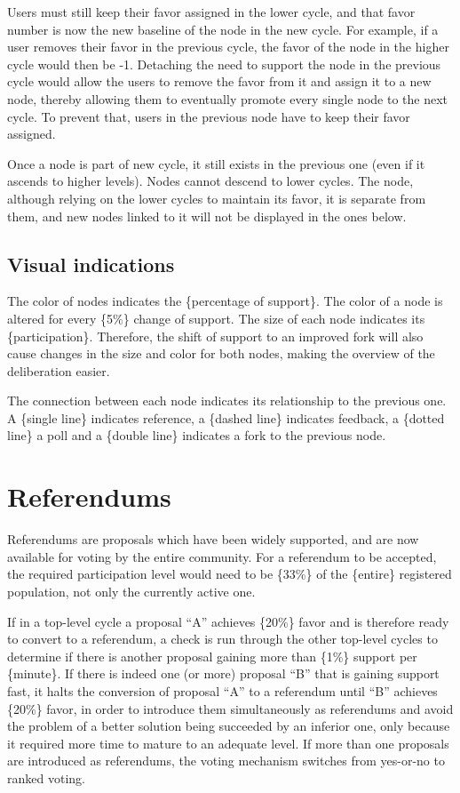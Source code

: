 \documentclass[a4paper,11pt]{article}
\begin{document}
\begin{multicols}{2}
Users must still keep their favor assigned in the lower cycle, and that favor number is now the new baseline of the node in the new cycle. For example, if a user removes their favor in the previous cycle, the favor of the node in the higher cycle would then be -1. Detaching the need to support the node in the previous cycle would allow the users to remove the favor from it and assign it to a new node, thereby allowing them to eventually promote every single node to the next cycle. To prevent that, users in the previous node have to keep their favor assigned.

Once a node is part of new cycle, it still exists in the previous one (even if it ascends to higher levels). Nodes cannot descend to lower cycles. The node, although relying on the lower cycles to maintain its favor, it is separate from them, and new nodes linked to it will not be displayed in the ones below.

\subsection{Visual indications} \label{visual}

The color of nodes indicates the \{percentage of support\}. The color of a node is altered for every \{5\%\} change of support. The size of each node indicates its \{participation\}. Therefore, the shift of support to an improved fork will also cause changes in the size and color for both nodes, making the overview of the deliberation easier.

The connection between each node indicates its relationship to the previous one. A \{single line\} indicates reference, a \{dashed line\} indicates feedback, a \{dotted line\} a poll and a \{double line\} indicates a fork to the previous node.

\section{Referendums} \label{referendums}

Referendums are proposals which have been widely supported, and are now available for voting by the entire community. For a referendum to be accepted, the required participation level would need to be \{33\%\} of the \{entire\} registered population, not only the currently active one.

If in a top-level cycle a proposal “A” achieves \{20\%\} favor and is therefore ready to convert to a referendum, a check is run through the other top-level cycles to determine if there is another proposal gaining more than \{1\%\} support per \{minute\}. If there is indeed one (or more) proposal “B” that is gaining support fast, it halts the conversion of proposal “A” to a referendum until “B” achieves \{20\%\} favor, in order to introduce them simultaneously as referendums and avoid the problem of a better solution being succeeded by an inferior one, only because it required more time to mature to an adequate level. If more than one proposals are introduced as referendums, the voting mechanism switches from yes-or-no to ranked voting.


\end{multicols}
\end{document}
